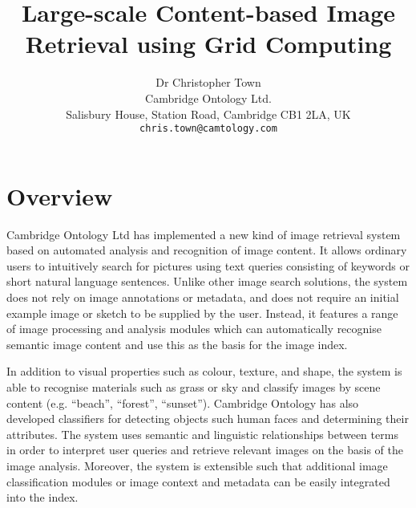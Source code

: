 \documentclass[10pt]{article}
\begin{document}
\date{}

\title{\Large\bf Large-scale Content-based Image Retrieval using Grid Computing}


\author{Dr Christopher Town\\
Cambridge Ontology Ltd.\\
Salisbury House, Station Road, Cambridge CB1 2LA, UK\\
{\tt chris.town@camtology.com}\\
}


\maketitle


\section{Overview}


Cambridge Ontology Ltd has implemented a new kind of image retrieval system based on automated analysis and recognition of image content. It allows ordinary users to intuitively search for pictures using text queries consisting of keywords or short natural language sentences. Unlike other image search solutions, the system does not rely on image annotations or metadata, and does not require an initial example image or sketch to be supplied by the user. Instead, it features a range of image processing and analysis modules which can automatically recognise semantic image content and use this as the basis for the image index. 

In addition to visual properties such as colour, texture, and shape, the system is able to recognise materials such as grass or sky and classify images by scene content (e.g. ``beach'', ``forest'', ``sunset''). Cambridge Ontology has also developed classifiers for detecting objects such human faces and determining their attributes. The system uses semantic and linguistic relationships between terms in order to interpret user queries and retrieve relevant images on the basis of the image analysis. Moreover, the system is extensible such that additional image classification modules or image context and metadata can be easily integrated into the index.


\end{document}
